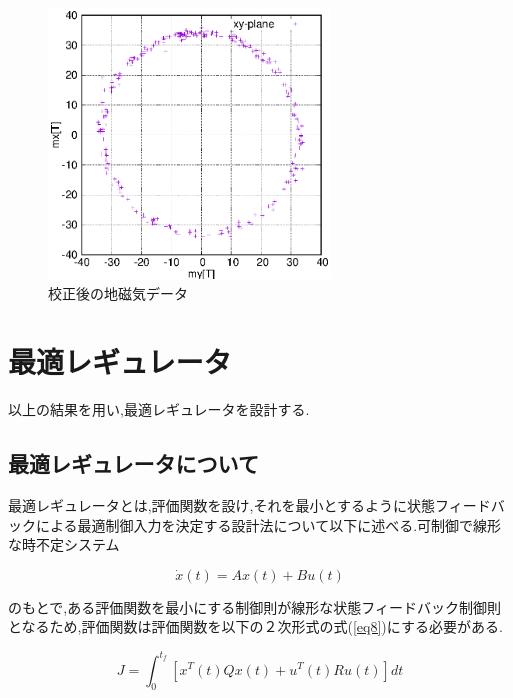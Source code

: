 \documentclass[12pt,oneside]{sotsuken_paper}
\begin{document}
\begin{figure}[htbp]
	\begin{center}
		\includegraphics[width=75mm]{image/calibration/mag-calib-af.eps}
		\caption{校正後の地磁気データ}
		\label{fig:mag-calib-af}
	\end{center}
\end{figure}

\section{最適レギュレータ}
以上の結果を用い,最適レギュレータを設計する.

\subsection{最適レギュレータについて}

最適レギュレータとは,評価関数を設け,それを最小とするように状態フィードバックによる最適制御入力を決定する設計法について以下に述べる.可制御で線形な時不定システム

\begin{equation}
	\dot{x}(t) = Ax(t)+Bu(t)
	\label{eq10}
\end{equation}

のもとで,ある評価関数を最小にする制御則が線形な状態フィードバック制御則となるため,評価関数は評価関数を以下の２次形式の式(\ref{eq8})にする必要がある.

\begin{equation}
	J = \int^{t_f}_0 [x^T(t)Qx(t)+u^T(t)Ru(t)]dt
	\label{eq11}
\end{equation}
\end{document}
